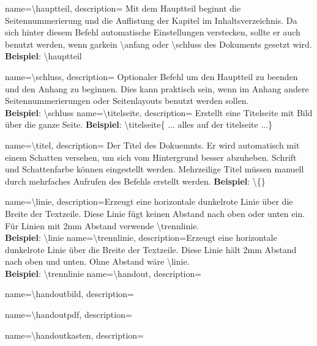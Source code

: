 {
    name={\textbackslash hauptteil},
    description={
            Mit dem Hauptteil beginnt die Seitennummerierung und die Auflistung der Kapitel im Inhaltsverzeichnis. Da sich hinter diesem Befehl automatische Einstellungen verstecken, sollte er auch benutzt werden, wenn garkein \textbackslash anfang oder \textbackslash schluss des Dokuments gesetzt wird.\\
            \textbf{Beispiel}: \textbackslash hauptteil
        }
}



{
    name={\textbackslash schluss},
    description={
            Optionaler Befehl um den Hauptteil zu beenden und den Anhang zu beginnen. Dies kann praktisch sein, wenn im Anhang andere Seitennummerierungen oder Seitenlayouts benutzt werden sollen.\\
            \textbf{Beispiel}: \textbackslash schluss
        }
}
{
    name={\textbackslash titelseite},
    description={
            Erstellt eine Titelseite mit Bild über die ganze Seite.\newline
            \textbf{Beispiel}: \textbackslash titelseite\{ ... alles auf der titelseite ...\}
        }
}


{
    name={\textbackslash titel},
    description={
            Der Titel des Dokuemnts. Er wird automatisch mit einem Schatten versehen, um sich vom Hintergrund besser abzuheben. Schrift und Schattenfarbe können eingestellt werden. Mehrzeilige Titel müssen manuell durch mehrfaches Aufrufen des Befehls erstellt werden.
            \textbf{Beispiel}: \textbackslash \{\}\newline
        }
}

{
    name={\textbackslash linie},
    description={Erzeugt eine horizontale dunkelrote Linie über die Breite der Textzeile. Diese Linie fügt keinen Abstand nach oben oder unten ein. Für Linien mit 2mm Abstand verwende \textbackslash trennlinie.\\
            \textbf{Beispiel}: \textbackslash linie
        }
}
{
    name={\textbackslash trennlinie},
    description={Erzeugt eine horizontale dunkelrote Linie über die Breite der Textzeile. Diese Linie hält 2mm Abstand nach oben und unten. Ohne Abstand wäre \textbackslash linie.\\
            \textbf{Beispiel}: \textbackslash trennlinie
        }
}
{
    name={\textbackslash handout},
    description={}
}

{
    name={\textbackslash handoutbild},
    description={}
}

{
    name={\textbackslash handoutpdf},
    description={}
}


{
    name={\textbackslash handoutkasten},
    description={}
}
